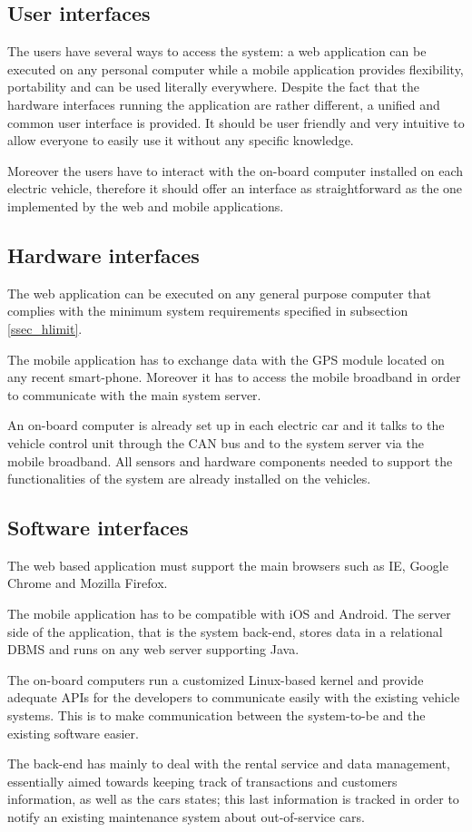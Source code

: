 \subsection{User interfaces}
The users have several ways to access the system: a web application can be executed on any personal computer while a mobile application provides flexibility, portability and can be used literally everywhere. Despite the fact that the hardware interfaces running the application are rather different, a unified and common user interface is provided. It should be user friendly and very intuitive to allow everyone to easily use it without any specific knowledge.

Moreover the users have to interact with the on-board computer installed on each electric vehicle, therefore it should offer an interface as straightforward as the one implemented by the web and mobile applications.

\subsection{Hardware interfaces} \label{hw_int}
The web application can be executed on any general purpose computer that complies with the minimum system requirements specified in subsection \ref{ssec_hlimit}.

The mobile application has to exchange data with the GPS module located on any recent smart-phone. Moreover it has to access the mobile broadband in order to communicate with the main system server.

An on-board computer is already set up in each electric car and it talks to the vehicle control unit through the CAN bus and to the system server via the mobile broadband. All sensors and hardware components needed to support the functionalities of the system are already installed on the vehicles.

\subsection{Software interfaces}
The web based application must support the main browsers such as IE, Google Chrome and Mozilla Firefox.

The mobile application has to be compatible with iOS and Android. The server side of the application, that is the system back-end, stores data in a relational DBMS and runs on any web server supporting Java.

The on-board computers run a customized Linux-based kernel and provide adequate APIs for the developers to communicate easily with the existing vehicle systems. This is to make communication between the system-to-be and the existing software easier.

The back-end has mainly to deal with the rental service and data management, essentially aimed towards keeping track of transactions and customers information, as well as the cars states; this last information is tracked in order to notify an existing maintenance system about out-of-service cars.